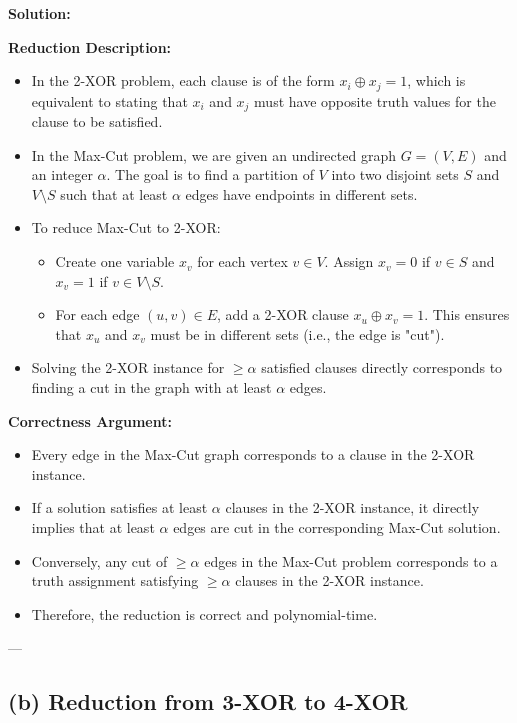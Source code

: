 \documentclass[11pt]{article}
\newenvironment{solution}{%
    \par\noindent\textbf{Solution:}\par%
}{\par}
\begin{document}
\begin{solution}
\textbf{Reduction Description:}
\begin{itemize}
    \item In the 2-XOR problem, each clause is of the form \( x_i \oplus x_j = 1 \), which is equivalent to stating that \( x_i \) and \( x_j \) must have opposite truth values for the clause to be satisfied.
    \item In the Max-Cut problem, we are given an undirected graph \( G = (V, E) \) and an integer \( \alpha \). The goal is to find a partition of \( V \) into two disjoint sets \( S \) and \( V \setminus S \) such that at least \( \alpha \) edges have endpoints in different sets.
    \item To reduce Max-Cut to 2-XOR:
    \begin{itemize}
        \item Create one variable \( x_v \) for each vertex \( v \in V \). Assign \( x_v = 0 \) if \( v \in S \) and \( x_v = 1 \) if \( v \in V \setminus S \).
        \item For each edge \( (u, v) \in E \), add a 2-XOR clause \( x_u \oplus x_v = 1 \). This ensures that \( x_u \) and \( x_v \) must be in different sets (i.e., the edge is "cut").
    \end{itemize}
    \item Solving the 2-XOR instance for \( \geq \alpha \) satisfied clauses directly corresponds to finding a cut in the graph with at least \( \alpha \) edges.
\end{itemize}

\textbf{Correctness Argument:}
\begin{itemize}
    \item Every edge in the Max-Cut graph corresponds to a clause in the 2-XOR instance.
    \item If a solution satisfies at least \( \alpha \) clauses in the 2-XOR instance, it directly implies that at least \( \alpha \) edges are cut in the corresponding Max-Cut solution.
    \item Conversely, any cut of \( \geq \alpha \) edges in the Max-Cut problem corresponds to a truth assignment satisfying \( \geq \alpha \) clauses in the 2-XOR instance.
    \item Therefore, the reduction is correct and polynomial-time.
\end{itemize}
\end{solution}

---

\subsection*{(b) Reduction from 3-XOR to 4-XOR}
\end{document}
